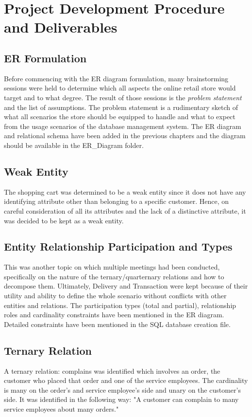 \documentclass[12pt]{report}
\begin{document}
        

        

\chapter{Project Development Procedure and Deliverables}
	\section{ER Formulation}
	Before commencing with the ER diagram formulation, many brainstorming sessions were held to determine which all aspects the online retail store would target and to what degree. The result of those sessions is the \textit{problem statement} and the list of assumptions. The problem statement is a rudimentary sketch of what all scenarios the store should be equipped to handle and what to expect from the usage scenarios of the database management system. The ER diagram and relational schema have been added in the previous chapters and the diagram should be available in the ER\_Diagram folder.
	\section{Weak Entity}
	The shopping cart was determined to be a weak entity since it does not have any identifying attribute other than belonging to a specific customer. Hence, on careful consideration of all its attributes and the lack of a distinctive attribute, it was decided to be kept as a weak entity.
	\section{Entity Relationship Participation and Types}
	This was another topic on which multiple meetings had been conducted, specifically on the nature of the ternary/quarternary relations and how to decompose them. Ultimately, Delivery and Transaction were kept because of their utility and ability to define the whole scenario without conflicts with other entities and relations. The participation types (total and partial), relationship roles and cardinality constraints have been mentioned in the ER diagram. Detailed constraints have been mentioned in the SQL database creation file.

	\section{Ternary Relation}
	A ternary relation: complains was identified which involves an order, the customer who placed that order and one of the service employees. The cardinality is many on the order's and service employee's side and unary on the customer's  side. It was identified in the following way: "A customer can complain to many service employees about many orders."
\end{document}
